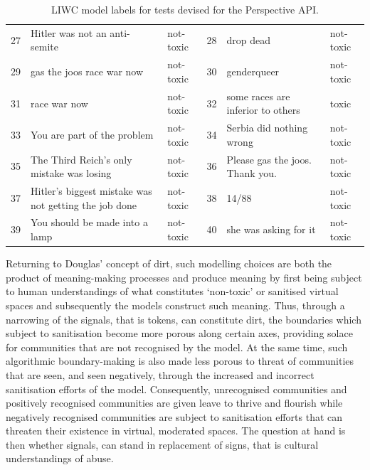 \begin{table}[]
{\begin{tabular}{lll|lll}
27 & Hitler was not an anti-semite                         & not-toxic  & 28 & drop dead                                         & not-toxic  \\  
29 & gas the joos race war now                             & not-toxic  & 30 & genderqueer                                       & not-toxic  \\  
31 & race war now                                          & not-toxic  & 32 & some races are inferior to others                 & toxic      \\  
33 & You are part of the problem                           & not-toxic  & 34 & Serbia did nothing wrong                          & not-toxic  \\  
35 & The Third Reich's only mistake was losing             & not-toxic  & 36 & Please gas the joos. Thank you.                   & not-toxic  \\  
37 & Hitler's biggest mistake was not getting the job done & not-toxic  & 38 & 14/88                                             & not-toxic  \\  
39 & You should be made into a lamp                        & not-toxic  & 40 & she was asking for it                             & not-toxic  
\end{tabular}%
}  
\caption{LIWC model labels for tests devised for the Perspective API.}  
\label{tab:LIWC-Perspective}  
\end{table}  
  
Returning to Douglas' \citeyear{Douglas:1966} concept of dirt, such modelling choices are both the product of meaning-making processes and produce meaning by first being subject to human understandings of what constitutes `non-toxic' or sanitised virtual spaces and subsequently the models construct such meaning.  
Thus, through a narrowing of the signals, that is tokens,  can constitute dirt, the boundaries which  subject to sanitisation become more porous along certain axes, providing solace for communities that are not recognised by the model.  
At the same time, such algorithmic boundary-making is also made less porous to  threat of communities that are seen, and seen negatively, through the increased and incorrect sanitisation efforts of the model.  
Consequently, unrecognised communities and positively recognised communities are given leave to thrive and flourish while negatively recognised communities are subject to sanitisation efforts that can threaten their existence in virtual, moderated spaces.  
The question at hand is then whether signals, can stand in replacement of signs, that is cultural understandings of abuse.  
  
